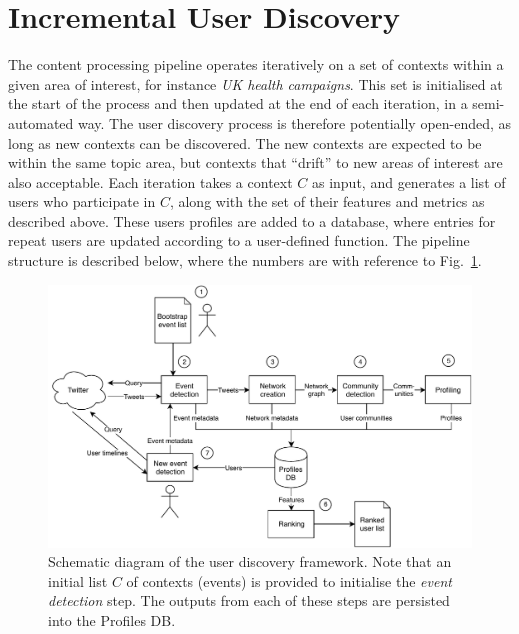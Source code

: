 \section{Incremental User Discovery} \label{sec:Pipeline}

The content processing pipeline operates iteratively on a set of contexts within a given area of interest, for instance \textit{UK health campaigns}. This set is initialised at the start of the process and then updated at the end of each iteration, in a semi-automated way. 
The user discovery process is therefore potentially open-ended, as long as new contexts can be discovered.
The new contexts are expected to be within the same topic area, but contexts that ``drift'' to new areas of interest are also acceptable. 
Each iteration takes a context $C$  as input, and generates a list of users who participate in $C$, along with the  set of their features and metrics as described above. 
These users profiles are added to a database, where entries for repeat users are updated according to a user-defined function. 
%
The pipeline structure is described below, where the numbers are with reference to Fig.~\ref{fig:twitterframework}.

\begin{figure}
	\centering
	\includegraphics[width=\textwidth]{figures/TwitterFramework}
	\caption{Schematic diagram of the user discovery framework. Note that an initial list $C$ of contexts (events) is provided to initialise the \textit{event detection} step. 
	The outputs from each of these steps are persisted into the Profiles DB.}
	\label{fig:twitterframework}
\end{figure}

